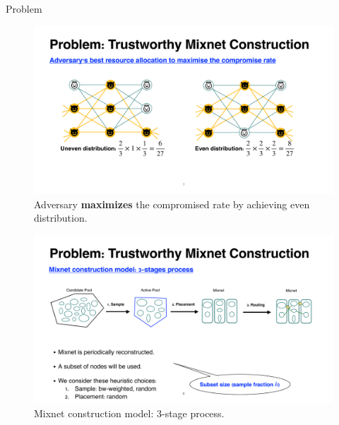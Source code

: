 \documentclass[final]{beamer}
\newlength{\leftcolwidth}
\newlength{\rightcolwidth}
\begin{document}
\begin{frame}[t]
\begin{columns}[t]
\begin{column}{\leftcolwidth}
\begin{block}{Problem}
\begin{center}
  \vspace{1cm}

    \begin{figure}
    \includegraphics[width=\rightcolwidth]{images/problem_max.pdf}
    \caption{Adversary \textbf{maximizes} the compromised rate by achieving even distribution.}
  \end{figure}
  
  \vspace{1cm}
  
    \begin{figure}
    \includegraphics[width=\rightcolwidth]{images/problem_model.pdf}
    \caption{Mixnet construction model: 3-stage process.}
  \end{figure}
    \end{center}
\end{block}


\end{column}
\end{columns}
\end{frame}
\end{document}
